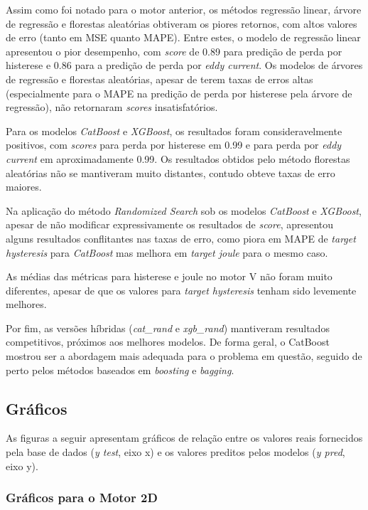 \documentclass{article}
\begin{document}
Assim como foi notado para o motor anterior, os métodos regressão linear, árvore de regressão e florestas aleatórias obtiveram os piores retornos, com altos valores de erro (tanto em MSE quanto MAPE). Entre estes, o modelo de regressão linear apresentou o pior desempenho, com \textit{score} de 0.89 para predição de perda por histerese e 0.86 para a predição de perda por \textit{eddy current}. Os modelos de árvores de regressão e florestas aleatórias, apesar de terem taxas de erros altas (especialmente para o MAPE na predição de perda por histerese pela árvore de regressão), não retornaram \textit{scores} insatisfatórios. 

Para os modelos \textit{CatBoost} e \textit{XGBoost}, os resultados foram consideravelmente positivos, com \textit{scores} para perda por histerese em 0.99 e para perda por \textit{eddy current} em aproximadamente 0.99. Os resultados obtidos pelo método florestas aleatórias não se mantiveram muito distantes, contudo obteve taxas de erro maiores.

Na aplicação do método \textit{Randomized Search} sob os modelos \textit{CatBoost} e \textit{XGBoost}, apesar de não modificar expressivamente os resultados de \textit{score}, apresentou alguns resultados conflitantes nas taxas de erro, como piora em MAPE de \textit{target hysteresis} para \textit{CatBoost} mas melhora em \textit{target joule} para o mesmo caso.

As médias das métricas para histerese e joule no motor V não foram muito diferentes, apesar de que os valores para \textit{target hysteresis} tenham sido levemente melhores.

Por fim, as versões híbridas (\textit{cat\_rand} e \textit{xgb\_rand}) mantiveram resultados competitivos, próximos aos melhores modelos. De forma geral, o CatBoost mostrou ser a abordagem mais adequada para o problema em questão, seguido de perto pelos métodos baseados em \textit{boosting} e \textit{bagging}.

\newpage

\subsection{Gráficos}

As figuras a seguir apresentam gráficos de relação entre os valores reais fornecidos pela base de dados (\textit{y test}, eixo x) e os valores preditos pelos modelos (\textit{y pred}, eixo y).

\subsubsection{Gráficos para o Motor 2D}
\end{document}
